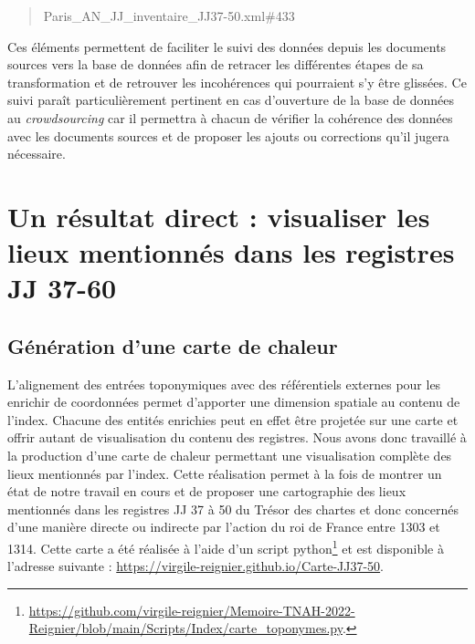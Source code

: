 \documentclass[a4paper,12pt,twoside]{book}
\begin{document}
	\begin{quotation}
		Paris\_AN\_JJ\_inventaire\_JJ37-50.xml\#433
	\end{quotation}
	
	\noindent Ces éléments permettent de faciliter le suivi des données depuis les documents sources vers la base de données afin de retracer les différentes étapes de sa transformation et de retrouver les incohérences qui pourraient s'y être glissées. Ce suivi paraît particulièrement pertinent en cas d'ouverture de la base de données au \textit{crowdsourcing} car il permettra à chacun de vérifier la cohérence des données avec les documents sources et de proposer les ajouts ou corrections qu'il jugera nécessaire.
	
	\section{Un résultat direct : visualiser les lieux mentionnés dans les registres JJ 37-60}
	
	\subsection{Génération d'une carte de chaleur}
	
	L'alignement des entrées toponymiques avec des référentiels externes pour les enrichir de coordonnées permet d'apporter une dimension spatiale au contenu de l'index. Chacune des entités enrichies peut en effet être projetée sur une carte et offrir autant de visualisation du contenu des registres. Nous avons donc travaillé à la production d'une carte de chaleur permettant une visualisation complète des lieux mentionnés par l'index. Cette réalisation permet à la fois de montrer un état de notre travail en cours et de proposer une cartographie des lieux mentionnés dans les registres JJ 37 à 50 du Trésor des chartes et donc concernés d'une manière directe ou indirecte par l'action du roi de France entre 1303 et 1314. Cette carte a été réalisée à l'aide d'un script python\footnote{\url{https://github.com/virgile-reignier/Memoire-TNAH-2022-Reignier/blob/main/Scripts/Index/carte_toponymes.py}.} et est disponible à l'adresse suivante : \url{https://virgile-reignier.github.io/Carte-JJ37-50}.
	
\end{document}
